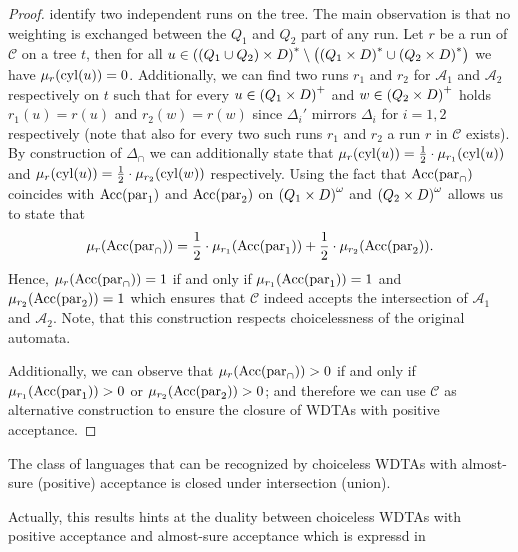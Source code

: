 \begin{proof}
  identify two independent runs on the tree. The main observation is that no
  weighting is exchanged between the $Q_{1}$ and $Q_{2}$ part of any run. Let
  $r$ be a run of $\mathcal{C}$ on a tree $t$, then for all $u\in \left(
    \left(Q_{1}\cup Q_{2}\right)\times D\right)^{*}\setminus\left(
    \left(Q_{1}\times D\right)^{*}\cup\left(Q_{2}\times D\right)^{*}\right)$ we have 
  $\mu_{r}(\operatorname{cyl}(u)) = 0$. Additionally, we can find two runs $r_{1}$ and 
  $r_{2}$ for $\mathcal{A}_{1}$ and $\mathcal{A}_{2}$ respectively on $t$ such
  that for every $u\in\left(Q_{1}\times D\right)^{+}$ and 
  $w\in\left(Q_{2}\times D\right)^{+}$ holds $r_{1}(u)=r(u)$ and $r_{2}(w)=r(w)$ 
  since $\Delta_{i}'$ mirrors $\Delta_{i}$ for $i= 1,2$ respectively (note that
  also for every two such runs $r_{1}$ and $r_{2}$ a run $r$ in $\mathcal{C}$
  exists). By construction of $\Delta_{\cap}$ we can additionally state that 
  $\mu_{r}(\operatorname{cyl}(u)) = \frac{1}{2}\cdot\mu_{r_{1}}(\operatorname{cyl}(u))$ and 
  $\mu_{r}(\operatorname{cyl}(u)) = \frac{1}{2}\cdot\mu_{r_{2}}(\operatorname{cyl}(w))$ respectively. Using
  the fact that $\operatorname{Acc}(\operatorname{par}_{\cap})$ coincides with $\operatorname{Acc}(\operatorname{par}_{1})$ and
  $\operatorname{Acc}(\operatorname{par}_{2})$ on $\left(Q_{1}\times D\right)^{\omega}$ and 
  $\left(Q_{2}\times D\right)^{\omega}$ allows us to state that
  \begin{equation*}
    \mu_{r}(\operatorname{Acc}(\operatorname{par}_{\cap})) = 
      \frac{1}{2}\cdot\mu_{r_{1}}(\operatorname{Acc}(\operatorname{par}_{1})) 
    + \frac{1}{2}\cdot\mu_{r_{2}}(\operatorname{Acc}(\operatorname{par}_{2})).
  \end{equation*}
  Hence, $\mu_{r}(\operatorname{Acc}(\operatorname{par}_{\cap})) = 1$ if and only if 
  $\mu_{r_{1}}(\operatorname{Acc}(\operatorname{par}_{1})) = 1$ and 
  $\mu_{r_{2}}(\operatorname{Acc}(\operatorname{par}_{2})) = 1$ which ensures that $\mathcal{C}$ indeed
  accepts the intersection of $\mathcal{A}_{1}$ and $\mathcal{A}_{2}$. Note,
  that this construction respects choicelessness of the original automata.

  Additionally, we can observe that $\mu_{r}(\operatorname{Acc}(\operatorname{par}_{\cap})) > 0$ if and 
  only if $\mu_{r_{1}}(\operatorname{Acc}(\operatorname{par}_{1}))>0$ or 
  $\mu_{r_{2}}(\operatorname{Acc}(\operatorname{par}_{2}))>0$; and therefore we can use $\mathcal{C}$ as
  alternative construction to ensure the closure of \acp{WDTA} with positive
  acceptance.
\end{proof}
\begin{corollary}
  The class of languages that can be recognized by choiceless \acp{WDTA} with
  almost-sure (positive) acceptance is closed under intersection (union).
\end{corollary}
Actually, this results hints at the duality between choiceless \acp{WDTA} with
positive acceptance and almost-sure acceptance which is expressd in
